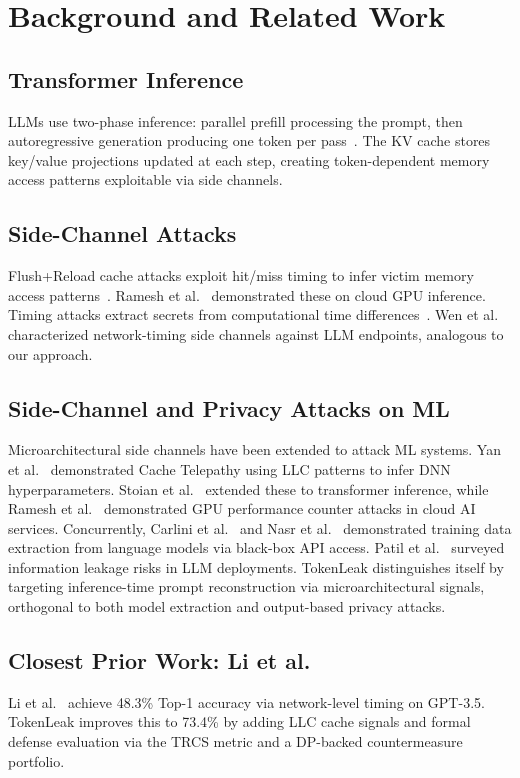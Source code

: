 \documentclass[conference,10pt,twocolumn]{IEEEtran}
\begin{document}
\section{Background and Related Work}
\label{sec:background}

\subsection{Transformer Inference}

LLMs use two-phase inference: parallel prefill processing the prompt, then
autoregressive generation producing one token per pass~\cite{vaswani2017attention,brown2020language}.
The KV cache stores key/value projections updated at each step, creating token-dependent
memory access patterns exploitable via side channels.
\subsection{Side-Channel Attacks}
Flush+Reload cache attacks exploit hit/miss timing to infer victim memory access
patterns~\cite{yarom2014flush}. Ramesh et al.~\cite{ramesh2024profiling} demonstrated these
on cloud GPU inference. Timing attacks extract secrets from computational time differences~\cite{kocher1996timing}.
Wen et al.~\cite{wen2024side} characterized network-timing side channels against LLM endpoints,
analogous to our approach.
\subsection{Side-Channel and Privacy Attacks on ML}
Microarchitectural side channels have been extended to attack ML systems.
Yan et al.~\cite{yan2020cache} demonstrated Cache Telepathy using LLC
patterns to infer DNN hyperparameters. Stoian et al.~\cite{stoian2024cachegrind}
extended these to transformer inference, while Ramesh et al.~\cite{ramesh2024profiling}
demonstrated GPU performance counter attacks in cloud AI services.
Concurrently, Carlini et al.~\cite{carlini2021extracting} and Nasr et
al.~\cite{nasr2023scalable} demonstrated training data extraction from
language models via black-box API access. Patil et al.~\cite{patil2024review}
surveyed information leakage risks in LLM deployments. TokenLeak distinguishes
itself by targeting inference-time prompt reconstruction via microarchitectural
signals, orthogonal to both model extraction and output-based privacy attacks.
\subsection{Closest Prior Work: Li et al.~\cite{li2024prompt}}
Li et al.~\cite{li2024prompt} achieve 48.3\% Top-1 accuracy via
network-level timing on GPT-3.5. TokenLeak improves this to 73.4\% by
adding LLC cache signals and formal defense evaluation via the TRCS metric
and a DP-backed countermeasure portfolio.
\end{document}
